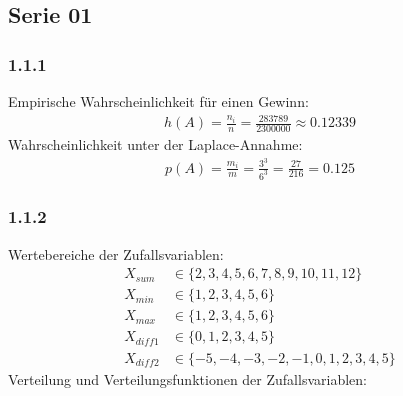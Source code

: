 \subsection*{Serie 01}
\subsubsection*{1.1.1}
Empirische Wahrscheinlichkeit für einen Gewinn:
\begin{align*}
h(A) = \frac{n_i}{n} = \frac{283789}{2300000} \approx 0.12339
\end{align*}
Wahrscheinlichkeit unter der Laplace-Annahme:
\begin{align*}
p(A) = \frac{m_i}{m} = \frac{3^3}{6^3} = \frac{27}{216} = 0.125
\end{align*}
\subsubsection*{1.1.2}
Wertebereiche der Zufallsvariablen:
\begin{align*}
X_{sum} & \in \{ 2, 3, 4, 5, 6,7,8,9,10,11,12\} \\
X_{min} & \in \{1, 2, 3, 4, 5, 6\}\\
X_{max} & \in \{1, 2, 3, 4, 5, 6\}\\
X_{diff1} & \in \{0, 1, 2, 3, 4, 5\}\\
X_{diff2} & \in \{-5, -4, -3, -2, -1, 0, 1, 2, 3, 4, 5\}
\end{align*}
Verteilung und Verteilungsfunktionen der Zufallsvariablen:\\

